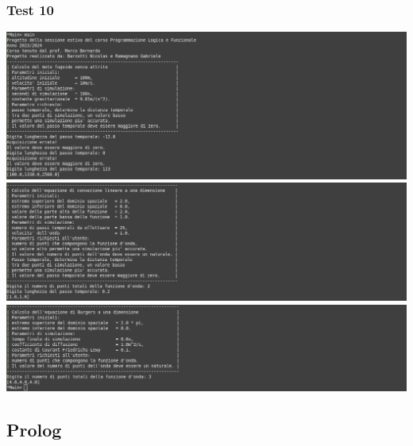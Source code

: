 \subsubsection*{Test 10}
\includegraphics[width=\textwidth,height=\textheight,keepaspectratio]{05_testing/image/hs/10_test/01_misto.png}
\\
\includegraphics[width=\textwidth,height=\textheight,keepaspectratio]{05_testing/image/hs/10_test/03_misto.png}
\\
\includegraphics[width=\textwidth,height=\textheight,keepaspectratio]{05_testing/image/hs/10_test/04_misto.png}


\subsection{Prolog}


